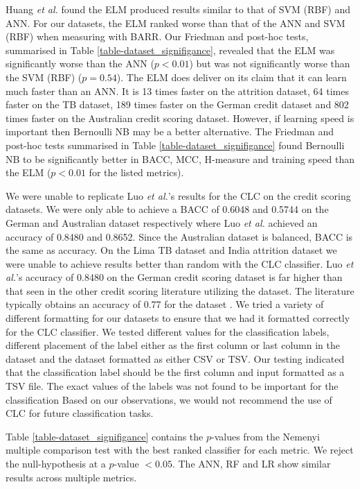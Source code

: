 \documentclass{sig-alternate-05-2015}
\begin{document}
	Huang \textit{et al.} \cite{6035797, Huang2006489} found the ELM produced results similar to that of SVM (RBF) and ANN. For our datasets, the ELM ranked worse than that of the ANN and SVM (RBF) when measuring with BARR. Our Friedman and post-hoc tests, summarised in Table \ref{table-dataset_signifigance}, revealed that the ELM was significantly worse than the ANN ($p<0.01$) but was not significantly worse than the SVM (RBF) ($p=0.54$). The ELM does deliver on its claim that it can learn much faster than an ANN. It is 13 times faster on the attrition dataset, 64 times faster on the TB dataset, 189 times faster on the German credit dataset and 802 times faster on the Australian credit scoring dataset. However, if learning speed is important then Bernoulli NB may be a better alternative. The Friedman and post-hoc tests summarised in Table \ref{table-dataset_signifigance} found Bernoulli NB to be significantly better in BACC, MCC, H-measure and training speed than the ELM ($p<0.01$ for the listed metrics).
	
	We were unable to replicate Luo \textit{et al.}'s \cite{Luo20097562} results for the CLC on the credit scoring datasets. We were only able to achieve a BACC of 0.6048 and 0.5744 on the German and Australian dataset respectively where Luo \textit{et al.} achieved an accuracy of 0.8480 and 0.8652. Since the Australian dataset is balanced, BACC is the same as accuracy. On the Lima TB dataset and India attrition dataset we were unable to achieve results better than random with the CLC classifier. Luo \textit{et al.}'s accuracy of 0.8480 on the German credit scoring dataset is far higher than that seen in the other credit scoring literature utilizing the dataset. The literature typically obtains an accuracy of 0.77 for the dataset \cite{Huang2007847, Nanni20093028, Tsai20082639, Wang2011223}. We tried a variety of different formatting for our datasets to ensure that we had it formatted correctly for the CLC classifier. We tested different values for the classification labels, different placement of the label either as the first column or last column in the dataset and the dataset formatted as either CSV or TSV. Our testing indicated that the classification label should be the first column and input formatted as a TSV file. The exact values of the labels was not found to be important for the classification Based on our observations, we would not recommend the use of CLC for future classification tasks.	
	
	Table \ref{table-dataset_signifigance} contains the $p$-values from the Nemenyi multiple comparison test with the best ranked classifier for each metric. We reject the null-hypothesis at a $p$-value $< 0.05$. The ANN, RF and LR show similar results across multiple metrics.
	
\end{document}
